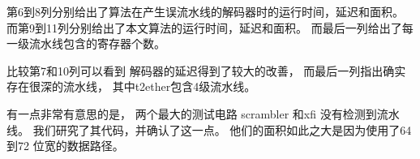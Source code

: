 第6到8列分别给出了算法在产生误流水线的解码器时的运行时间，延迟和面积。
而第9到11列分别给出了本文算法的运行时间，延迟和面积。
而最后一列给出了每一级流水线包含的寄存器个数。

比较第7和10列可以看到
解码器的延迟得到了较大的改善，
而最后一列指出确实存在很深的流水线，
其中t2ether包含4级流水线。

有一点非常有意思的是，
两个最大的测试电路 scrambler 和xfi 没有检测到流水线。
我们研究了其代码，并确认了这一点。
他们的面积如此之大是因为使用了64 到72 位宽的数据路径。

%
%
%


%
%
%

